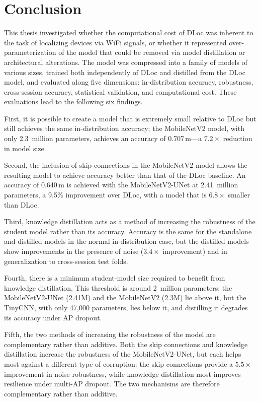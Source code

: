 \chapter{Conclusion}
\label{ch:conclusion}

This thesis investigated whether the computational cost of DLoc was inherent to the task of localizing
devices via WiFi signals, or whether it represented over-parameterization of the model that could be
removed via model distillation or architectural alterations. The model was compressed into a family of
models of various sizes, trained both independently of DLoc and distilled from the DLoc model, and
evaluated along five dimensions: in-distribution accuracy, robustness, cross-session accuracy,
statistical validation, and computational cost. These evaluations lead to the following six findings.

First, it is possible to create a model that is extremely small relative to DLoc but still achieves the
same in-distribution accuracy; the MobileNetV2 model, with only 2.3~million parameters, achieves an
accuracy of 0.707\,m---a $7.2\times$ reduction in model size.

Second, the inclusion of skip connections in the MobileNetV2 model allows the resulting model to achieve
accuracy better than that of the DLoc baseline. An accuracy of 0.640\,m is achieved with the
MobileNetV2-UNet at 2.41~million parameters, a 9.5\% improvement over DLoc, with a model that is
$6.8\times$ smaller than DLoc.

Third, knowledge distillation acts as a method of increasing the robustness of the student model rather
than its accuracy. Accuracy is the same for the standalone and distilled models in the normal
in-distribution case, but the distilled models show improvements in the presence of noise ($3.4\times$
improvement) and in generalization to cross-session test folds.

Fourth, there is a minimum student-model size required to benefit from knowledge distillation. This
threshold is around 2~million parameters: the MobileNetV2-UNet (2.41M) and the MobileNetV2 (2.3M) lie
above it, but the TinyCNN, with only 47{,}000 parameters, lies below it, and distilling it degrades its
accuracy under AP dropout.

Fifth, the two methods of increasing the robustness of the model are complementary rather than additive.
Both the skip connections and knowledge distillation increase the robustness of the MobileNetV2-UNet, but
each helps most against a different type of corruption: the skip connections provide a $5.5\times$
improvement in noise robustness, while knowledge distillation most improves resilience under multi-AP
dropout. The two mechanisms are therefore complementary rather than additive.

